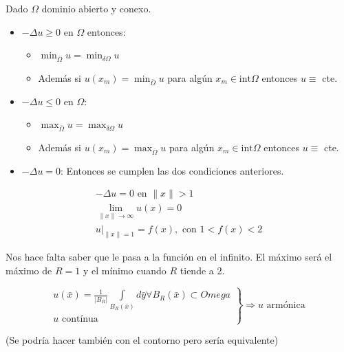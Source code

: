 		\begin{theorem}

			Dado $\Omega$ dominio abierto y conexo.

			\begin{itemize}
				\item $-\Delta u \geq 0$ en $\Omega$ entonces:
				\begin{itemize}
					\item $\min_{\bar{\Omega}} u = \min_{\delta \Omega} u$
					\item Además si $u(x_m) = \min_{\bar{\Omega}} u$ para algún $x_m \in \text{int} \Omega$ entonces $u \equiv$ cte.
				\end{itemize}

				\item $-\Delta u \leq 0$ en $\Omega$:
				\begin{itemize}
					\item $\max_{\bar{\Omega}} u = \max_{\delta \Omega} u$
					\item Además si $u(x_m) = \max_{\bar{\Omega}} u$ para algún $x_m \in \text{int} \Omega$ entonces $u \equiv$ cte.
				\end{itemize}

				\item $-\Delta u = 0$: Entonces se cumplen las dos condiciones anteriores.

			\end{itemize}

		\end{theorem}

		\begin{example}

			\[\begin{array}{l}
				-\Delta u = 0 \text{ en } \|x\| > 1 \\
				\lim_{\|x\| \to \infty} u(x) = 0 \\
				u|_{\|x\| = 1} = f(x), \text{ con } 1 < f(x) < 2
			\end{array}\]

			Nos hace falta saber que le pasa a la función en el infinito. El máximo será el máximo de $R=1$ y el mínimo cuando $R$ tiende a 2.

		\end{example}


		\begin{theorem}
			\[ \left. \begin{array}{l}
				u(\bar{x}) = \frac{1}{|B_R|} \int\limits_{B_R(\bar{x})} d\bar{y} \forall B_R(\bar{x}) \subset Omega \\
				u \text{ contínua }
			\end{array} \right\} \Rightarrow u \text{ armónica } \]

			(Se podría hacer también con el contorno pero sería equivalente)

		\end{theorem}

